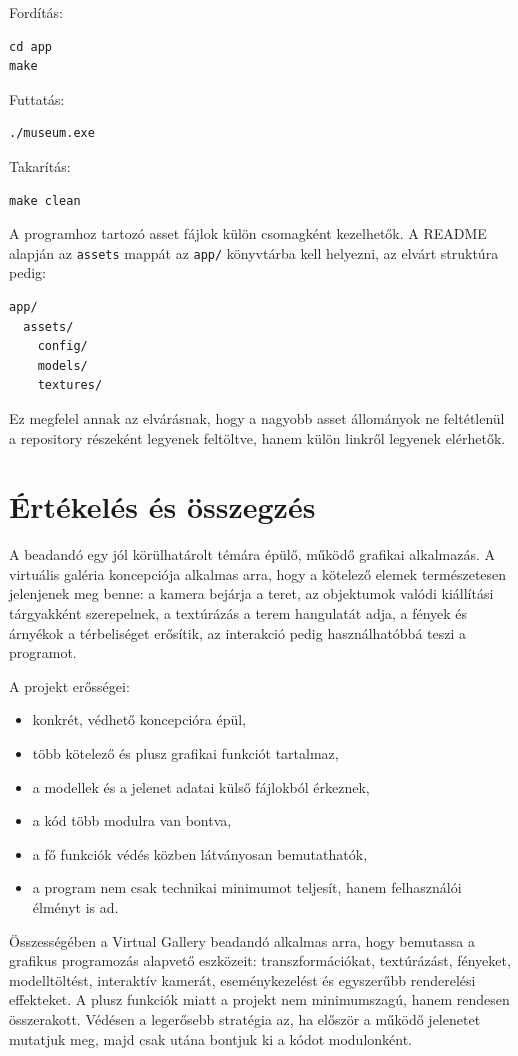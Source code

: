 \documentclass[12pt,a4paper]{article}
\newcommand{\code}[1]{\texttt{#1}}
\begin{document}
Fordítás:

\begin{verbatim}
cd app
make
\end{verbatim}

Futtatás:

\begin{verbatim}
./museum.exe
\end{verbatim}

Takarítás:

\begin{verbatim}
make clean
\end{verbatim}

A programhoz tartozó asset fájlok külön csomagként kezelhetők. A README alapján az \code{assets} mappát az \code{app/} könyvtárba kell helyezni, az elvárt struktúra pedig:

\begin{verbatim}
app/
  assets/
    config/
    models/
    textures/
\end{verbatim}

Ez megfelel annak az elvárásnak, hogy a nagyobb asset állományok ne feltétlenül a repository részeként legyenek feltöltve, hanem külön linkről legyenek elérhetők.

\section{Értékelés és összegzés}

A beadandó egy jól körülhatárolt témára épülő, működő grafikai alkalmazás. A virtuális galéria koncepciója alkalmas arra, hogy a kötelező elemek természetesen jelenjenek meg benne: a kamera bejárja a teret, az objektumok valódi kiállítási tárgyakként szerepelnek, a textúrázás a terem hangulatát adja, a fények és árnyékok a térbeliséget erősítik, az interakció pedig használhatóbbá teszi a programot.

A projekt erősségei:

\begin{itemize}
    \item konkrét, védhető koncepcióra épül,
    \item több kötelező és plusz grafikai funkciót tartalmaz,
    \item a modellek és a jelenet adatai külső fájlokból érkeznek,
    \item a kód több modulra van bontva,
    \item a fő funkciók védés közben látványosan bemutathatók,
    \item a program nem csak technikai minimumot teljesít, hanem felhasználói élményt is ad.
\end{itemize}

Összességében a Virtual Gallery beadandó alkalmas arra, hogy bemutassa a grafikus programozás alapvető eszközeit: transzformációkat, textúrázást, fényeket, modelltöltést, interaktív kamerát, eseménykezelést és egyszerűbb renderelési effekteket. A plusz funkciók miatt a projekt nem minimumszagú, hanem rendesen összerakott. Védésen a legerősebb stratégia az, ha először a működő jelenetet mutatjuk meg, majd csak utána bontjuk ki a kódot modulonként.
\end{document}
